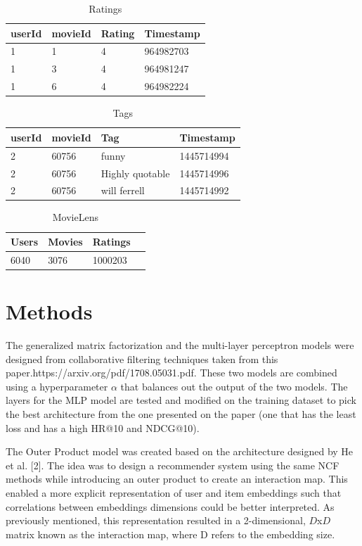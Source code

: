 \documentclass{article}
\begin{document}

\begin{table}[h]
\caption{Ratings}
\centering
\begin{tabular}{llll}
\toprule
userId & movieId & Rating & Timestamp \\
\midrule
1 & 1 & 4 & 964982703 \\
1 & 3 & 4 & 964981247 \\
1 & 6 & 4 & 964982224 \\
\bottomrule
\end{tabular}
\label{tab:table1}
\end{table}

\begin{table} [h]
\caption{Tags}
\centering
\begin{tabular}{llll}
\toprule
userId & movieId & Tag & Timestamp \\
\midrule
2 & 60756 & funny & 1445714994 \\
2 & 60756 & Highly quotable & 1445714996 \\
2 & 60756 & will ferrell & 1445714992 \\
\bottomrule
\end{tabular}
\label{tab:table2}
\end{table}

\begin{table}[h]
\caption{MovieLens}
\centering
\begin{tabular}{llll}
\toprule
Users & Movies & Ratings \\
\midrule
6040 & 3076 & 1000203 \\
\bottomrule
\end{tabular}
\label{tab:table1}
\end{table}

\section{Methods}
The generalized matrix factorization and the multi-layer perceptron models were designed from collaborative filtering techniques taken from this paper.https://arxiv.org/pdf/1708.05031.pdf. These two models are combined using a hyperparameter $\alpha$ that balances out the output of the two models. The layers for the MLP model are tested and modified on the training dataset to pick the best architecture from the one presented on the paper (one that has the least loss and has a high HR@10 and NDCG@10).

The Outer Product model was created based on the architecture designed by He et al. [2]. The idea was to design a recommender system using the same NCF methods while introducing an outer product to create an interaction map. This enabled a more explicit representation of user and item embeddings such that correlations between embeddings dimensions could be better interpreted. As previously mentioned, this representation resulted in a 2-dimensional, $D$x$D$ matrix known as the interaction map, where D refers to the embedding size. 
\end{document}
